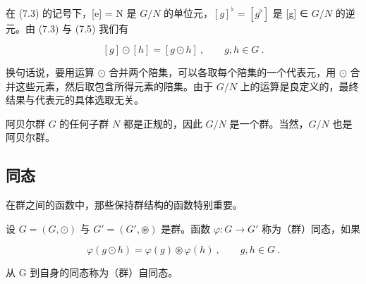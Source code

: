 \begin{remark}

\begin{items}
\item

在 (7.3) 的记号下，[e] = N 是 $G/N$ 的单位元，$[g]^{\flat}$ = $[g^{\flat}]$ 是 [g] ∈ $G/N$ 的逆元。由 (7.3) 与 (7.5) 我们有

\[
[g]\odot[h]=[g\odot h]~,\qquad g,h\in G~.
\]

换句话说，要用运算 $ \odot $ 合并两个陪集，可以各取每个陪集的一个代表元，用 $ \odot $ 合并这些元素，然后取包含所得元素的陪集。由于 $ G/N $ 上的运算是良定义的，最终结果与代表元的具体选取无关。

\item

阿贝尔群 $G$ 的任何子群 $N$ 都是正规的，因此 $G/N$ 是一个群。当然，$G/N$ 也是阿贝尔群。

\end{items}

\end{remark}

\subsection*{同态}

在群之间的函数中，那些保持群结构的函数特别重要。

设 $ G = (G, \odot) $ 与 $ G' = (G', \circledast) $ 是群。函数 $ \varphi: G \to G' $ 称为（群）同态，如果

\[
\varphi(g\odot h)=\varphi(g)\circledast\varphi(h)~,\qquad g,h\in G~.
\]

从 G 到自身的同态称为（群）自同态。

